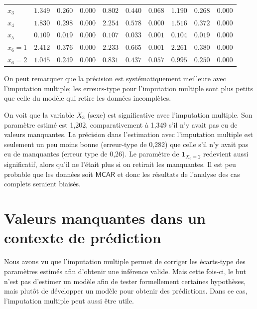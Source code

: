 \documentclass[
  11pt,
  letterpaper,
]{book}
\theoremstyle{definition}
\theoremstyle{definition}
\theoremstyle{definition}
\theoremstyle{definition}
\theoremstyle{remark}
\begin{document}
\begin{table}
\begin{tabular}[t]{lrrrrrrrrr}
$x_3$ & $1.349$ & $0.260$ & $0.000$ & $0.802$ & $0.440$ & $0.068$ & $1.190$ & $0.268$ & $0.000$\\
\addlinespace
$x_4$ & $1.830$ & $0.298$ & $0.000$ & $2.254$ & $0.578$ & $0.000$ & $1.516$ & $0.372$ & $0.000$\\
$x_5$ & $0.109$ & $0.019$ & $0.000$ & $0.107$ & $0.033$ & $0.001$ & $0.104$ & $0.019$ & $0.000$\\
$x_6=1$ & $2.412$ & $0.376$ & $0.000$ & $2.233$ & $0.665$ & $0.001$ & $2.261$ & $0.380$ & $0.000$\\
$x_6=2$ & $1.045$ & $0.249$ & $0.000$ & $0.831$ & $0.437$ & $0.057$ & $0.995$ & $0.250$ & $0.000$\\
\bottomrule
\end{tabular}
\end{table}

On peut remarquer que la précision est systématiquement meilleure avec l'imputation multiple; les erreurs-type pour l'imputation multiple sont plus petits que celle du modèle qui retire les données incomplètes.

On voit que la variable \(X_3\) (sexe) est significative avec l'imputation multiple. Son paramètre estimé est 1,202, comparativement à 1,349 s'il n'y avait pas eu de valeurs manquantes. La précision dans l'estimation avec l'imputation multiple est seulement un peu moins bonne (erreur-type de 0,282) que celle s'il n'y avait pas eu de manquantes (erreur type de 0,26). Le paramètre de \({\mathbf 1}_{X_6=2}\) redevient aussi significatif, alors qu'il ne l'était plus si on retirait les manquantes. Il est peu probable que les données soit \(\mathsf{MCAR}\) et donc les résultats de l'analyse des cas complets seraient biaisés.

\hypertarget{valeurs-manquantes-dans-un-contexte-de-pruxe9diction}{%
\section{Valeurs manquantes dans un contexte de prédiction}\label{valeurs-manquantes-dans-un-contexte-de-pruxe9diction}}

Nous avons vu que l'imputation multiple permet de corriger les écarts-type des paramètres estimés afin d'obtenir une inférence valide. Mais cette fois-ci, le but n'est pas d'estimer un modèle afin de tester formellement certaines hypothèses, mais plutôt de développer un modèle pour obtenir des prédictions. Dans ce cas, l'imputation multiple peut aussi être utile.
\end{document}
